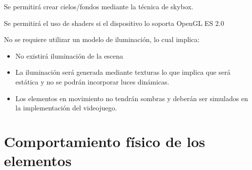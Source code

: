 \begin{description}
 { Se permitirá crear cielos/fondos mediante la técnica de skybox. }

 { Se permitirá el uso de shaders si el dispositivo lo soporta OpenGL ES 2.0 } 

 { No se requiere utilizar un modelo de iluminación, lo cual implica:
	\begin{itemize}
	\item No existirá iluminación de la escena 
	\item La iluminación será generada mediante texturas lo que implica que será estática y no se podrán incorporar luces dinámicas.
	\item Los elementos en movimiento no tendrán sombras y deberán ser simulados en la implementación del videojuego.
	\end{itemize}
}
\end{description}


\section{Comportamiento físico de los elementos}

